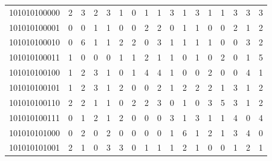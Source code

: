 \documentclass[10pt,a4paper]{article}
\begin{document}
\begin{longtable}{ |c|c|c|c|c|c|c|c|c|c|c|c|c|c|c|c|c| }
    101010100000              & 2                            & 3                                & 2                            & 3                              & 1   & 0   & 1   & 1   & 3   & 1   & 3   & 1   & 1   & 3   & 3   & 3   \\
    101010100001              & 0                            & 0                                & 1                            & 1                              & 0   & 0   & 2   & 2   & 0   & 1   & 1   & 0   & 0   & 2   & 1   & 2   \\
    101010100010              & 0                            & 6                                & 1                            & 1                              & 2   & 2   & 0   & 3   & 1   & 1   & 1   & 1   & 0   & 0   & 3   & 2   \\
    101010100011              & 1                            & 0                                & 0                            & 0                              & 1   & 1   & 2   & 1   & 1   & 0   & 1   & 0   & 2   & 0   & 1   & 5   \\
    101010100100              & 1                            & 2                                & 3                            & 1                              & 0   & 1   & 4   & 4   & 1   & 0   & 0   & 2   & 0   & 0   & 4   & 1   \\
    101010100101              & 1                            & 2                                & 3                            & 1                              & 2   & 0   & 0   & 2   & 1   & 2   & 2   & 2   & 1   & 3   & 1   & 2   \\
    101010100110              & 2                            & 2                                & 1                            & 1                              & 0   & 2   & 2   & 3   & 0   & 1   & 0   & 3   & 5   & 3   & 1   & 2   \\
    101010100111              & 0                            & 1                                & 2                            & 1                              & 2   & 0   & 0   & 0   & 3   & 1   & 3   & 1   & 1   & 4   & 0   & 4   \\
    101010101000              & 0                            & 2                                & 0                            & 2                              & 0   & 0   & 0   & 0   & 1   & 6   & 1   & 2   & 1   & 3   & 4   & 0   \\
    101010101001              & 2                            & 1                                & 0                            & 3                              & 3   & 0   & 1   & 1   & 1   & 2   & 1   & 0   & 0   & 1   & 2   & 1   \\

\end{longtable}
\end{document}
